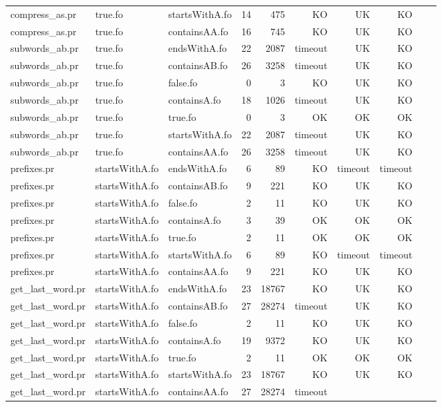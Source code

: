 \begin{tabular}{l|l|l|r|r|r|r|r|r|r}
compress\_as.pr & true.fo & startsWithA.fo & 14 & 475 & KO & 
UK & KO \\
compress\_as.pr & true.fo & containsAA.fo & 16 & 745 & KO & 
UK & KO \\
subwords\_ab.pr & true.fo & endsWithA.fo & 22 & 2087 & timeout & 
UK & KO \\
subwords\_ab.pr & true.fo & containsAB.fo & 26 & 3258 & timeout & 
UK & KO \\
subwords\_ab.pr & true.fo & false.fo & 0 & 3 & KO & 
UK & KO \\
subwords\_ab.pr & true.fo & containsA.fo & 18 & 1026 & timeout & 
UK & KO \\
subwords\_ab.pr & true.fo & true.fo & 0 & 3 & OK & 
OK & OK \\
subwords\_ab.pr & true.fo & startsWithA.fo & 22 & 2087 & timeout & 
UK & KO \\
subwords\_ab.pr & true.fo & containsAA.fo & 26 & 3258 & timeout & 
UK & KO \\
prefixes.pr & startsWithA.fo & endsWithA.fo & 6 & 89 & KO & 
timeout & timeout \\
prefixes.pr & startsWithA.fo & containsAB.fo & 9 & 221 & KO & 
UK & KO \\
prefixes.pr & startsWithA.fo & false.fo & 2 & 11 & KO & 
UK & KO \\
prefixes.pr & startsWithA.fo & containsA.fo & 3 & 39 & OK & 
OK & OK \\
prefixes.pr & startsWithA.fo & true.fo & 2 & 11 & OK & 
OK & OK \\
prefixes.pr & startsWithA.fo & startsWithA.fo & 6 & 89 & KO & 
timeout & timeout \\
prefixes.pr & startsWithA.fo & containsAA.fo & 9 & 221 & KO & 
UK & KO \\
get\_last\_word.pr & startsWithA.fo & endsWithA.fo & 23 & 18767 & KO & 
UK & KO \\
get\_last\_word.pr & startsWithA.fo & containsAB.fo & 27 & 28274 & timeout & 
UK & KO \\
get\_last\_word.pr & startsWithA.fo & false.fo & 2 & 11 & KO & 
UK & KO \\
get\_last\_word.pr & startsWithA.fo & containsA.fo & 19 & 9372 & KO & 
UK & KO \\
get\_last\_word.pr & startsWithA.fo & true.fo & 2 & 11 & OK & 
OK & OK \\
get\_last\_word.pr & startsWithA.fo & startsWithA.fo & 23 & 18767 & KO & 
UK & KO \\
get\_last\_word.pr & startsWithA.fo & containsAA.fo & 27 & 28274 & timeout & 

\end{tabular}
